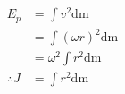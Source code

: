 \begin{align}
E_p&=\int v^2 \mathrm{dm}\\
&=\int (\omega r)^2 \mathrm{dm}\\
&=\omega^2\int r^2 \mathrm{dm}\\
\therefore J&=\int r^2 \mathrm{dm}
\end{align}